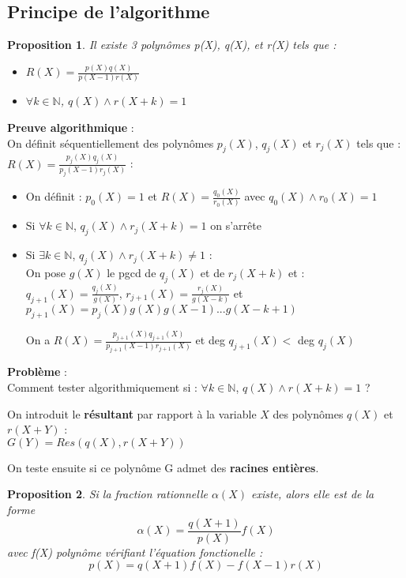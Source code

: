\documentclass[17 pt,french]{scrartcl}
\newtheorem{prop}{Proposition}
\begin{document}
	\subsection*{Principe de l'algorithme}
	\begin{prop}
		Il existe 3 polynômes p(X), q(X), et r(X) tels que : 
		\begin{itemize}
		 \item $R(X) = \frac{p(X)q(X)}{p(X-1)r(X)}$
	 	 \item $\forall k \in \mathbb{N}$, $q(X) \wedge r(X+k) = 1 $
	 \end{itemize}
	\end{prop}
	\textbf{Preuve algorithmique} : \\
	On définit séquentiellement des polynômes $p_j(X)$, $q_j(X)$ et $r_j(X)$ tels que : $R(X) = \frac{p_j(X)q_j(X)}{p_j(X-1)r_j(X)}$ : 
		\begin{itemize}
		\item On définit : $p_0(X) = 1$ et $R(X) = \frac{q_0(X)}{r_0(X)} $ avec $q_0(X) \wedge r_0(X) = 1$ 
		\item Si $\forall k \in \mathbb{N}$, $q_j(X) \wedge r_j(X+k) = 1 $ on s'arrête
		\item Si $\exists k \in \mathbb{N}$, $q_j(X) \wedge r_j(X+k) \neq 1 $ : \\
		On pose $g(X)$ le pgcd de $q_j(X)$ et de $r_j(X+k)$ et : \\
		$q_{j+1}(X) = \frac{q_j(X)}{g(X)}$, $r_{j+1}(X) = \frac{r_j(X)}{g(X-k)}$ et \\$p_{j+1}(X) = p_j(X)g(X)g(X-1)...g(X-k+1)$
		
		On a $R(X) = \frac{p_{j+1}(X)q_{j+1}(X)}{p_{j+1}(X-1)r_{j+1}(X)}$ et deg $q_{j+1}(X) < $ deg $q_{j}(X)$
		\end{itemize}
		
		
\textbf{Problème} : \\
Comment tester algorithmiquement si :  $\forall k \in \mathbb{N}$, $q(X) \wedge r(X+k) = 1 $ ?
	
On introduit le \textbf{résultant} par rapport à la variable $X$ des polynômes $q(X)$ et $r(X+Y)$ : \\$G(Y) = Res(q(X), r(X+Y))$ 

On teste ensuite si ce polynôme G admet des \textbf{racines entières}.

	\begin{prop}
		Si la fraction rationnelle $\alpha(X)$ existe, alors elle est de la forme 
			$$\alpha(X) = \frac{q(X+1)}{p(X)}f(X)$$
	    avec f(X) polynôme vérifiant l'équation fonctionelle : 
	        $$p(X) = q(X+1)f(X)-f(X-1)r(X)$$
	\end{prop}
	
\end{document}
